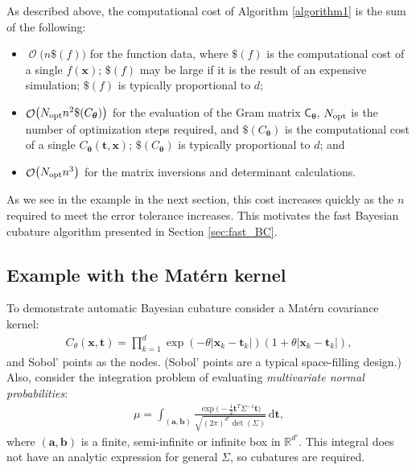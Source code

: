 \documentclass[twocolumn]{svjour3}          %
\DeclareMathOperator{\Order}{{\mathcal O}}
\newcommand{\bm}[1]{\boldsymbol{#1}}
\newcommand{\mSigma}{\mathsf{\Sigma}}
\newcommand{\dif}[1]{\text{d}{#1}}
\newcommand{\reals}{\mathbb{R}}
\newcommand{\vtheta}{{\bm{\theta}}}
\newcommand{\va}{\bm{a}}
\newcommand{\vb}{\bm{b}}
\newcommand{\vt}{\bm{t}}
\newcommand{\vx}{\bm{x}}
\newcommand{\dvt}{\dif{\bm{t}}}
\newcommand{\mC}{\mathsf{C}}
\newcommand{\opt}{{\textup{opt}}}
\begin{document}
As described above, the computational cost of Algorithm \ref{algorithm1} is the sum of the following:
\begin{itemize}
	\item $\Order\bigl(n\$(f) \bigr)$ for the function data, where $\$(f)$ is the computational cost of a single $f(\vx)$; $\$(f)$ may be large if it is the result of an expensive simulation; $\$(f)$ is typically proportional to $d$;
	
	\item $\Order\bigl(N_{\opt} n^2 \$(C_\vtheta) \bigr)$ for the evaluation of the Gram matrix $\mC_{\vtheta}$, $N_\opt$ is the number of optimization steps required, and  $\$(C_\vtheta)$ is the computational cost of a single $C_\vtheta(\vt,\vx)$; $\$(C_\vtheta)$ is typically proportional to $d$; and
	
	\item $\Order\bigl(N_{\opt} n^3 \bigr)$ for the matrix inversions and determinant calculations.
	
\end{itemize}
As we see in the example in the next section, this cost increases quickly as the $n$ required to meet the error tolerance increases.  This motivates the fast Bayesian cubature algorithm presented in Section \ref{sec:fast_BC}.


\subsection{Example with the Mat\'ern kernel} \label{MVN_example}

To demonstrate automatic Bayesian cubature consider a Mat\'ern covariance kernel:
\begin{align*}
C_{\theta}(\vx, \vt) = \prod_{k=1}^d \exp(-\theta|\vx_k-\vt_k|)(1+\theta |\vx_k-\vt_k|),
\end{align*}
and Sobol' points as the nodes.  (Sobol' points are a typical space-filling design.)
Also, consider the integration problem of evaluating  \emph{multivariate normal probabilities}:
\begin{align}
\label{eqn:GaussDef}
\mu = \int_{(\va,\vb)} \frac{\exp\bigl(- \frac 12 \vt^T \mSigma^{-1} \vt \bigr)}{\sqrt{(2 \pi)^{d'} \det(\mSigma)}} \, \dvt,
\end{align}
where $(\va,\vb)$ is a finite, semi-infinite or infinite box in $\reals^{d'}$.  This integral does not have an analytic expression for general $\mSigma$, so cubatures are required.  
\end{document}
